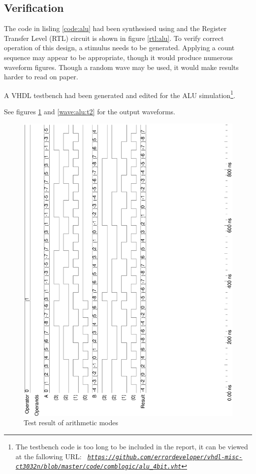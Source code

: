 \documentclass[10pt,a4paper]{report}
\begin{document}
\subsection{Verification}

 The code in lisling \ref{code:alu} had been synthesised
 using and the Register Transfer Level (RTL) circuit is
 shown in figure \ref{rtl:alu}.
 To verify correct operation of this design, a stimulus
 needs to be generated. Applying a count sequence may
 appear to be appropriate, though it would produce
 numerous waveform figures. Though a random wave may
 be used, it would make results harder to read on paper.

 A VHDL testbench had been generated and edited for the
 ALU simulation\footnote{The testbench code is too long
 to be included in the report, it can be viewed at the
 fallowing URL: \emph{\texttt{
\url{https://github.com/errordeveloper/vhdl-misc-ct3032n/blob/master/code/comblogic/alu_4bit.vht}}}
}.

 See figures \ref{wave:alu:t1} and \ref{wave:alu:t2}
 for the output waveforms.

\begin{figure}
\includegraphics[scale=0.5,angle=-90]{graphs/alu_4bit_test1.ps}
\caption{\small{Test result of arithmetic modes}} \label{wave:alu:t1}
\end{figure}
\end{document}

